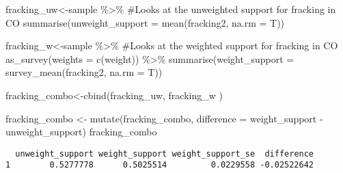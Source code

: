 \documentclass[
  letterpaper,
  DIV=11,
  numbers=noendperiod]{scrreprt}
\newenvironment{Shaded}{\begin{snugshade}}{\end{snugshade}}
\newcommand{\AttributeTok}[1]{\textcolor[rgb]{0.40,0.45,0.13}{#1}}
\newcommand{\CommentTok}[1]{\textcolor[rgb]{0.37,0.37,0.37}{#1}}
\newcommand{\FunctionTok}[1]{\textcolor[rgb]{0.28,0.35,0.67}{#1}}
\newcommand{\NormalTok}[1]{\textcolor[rgb]{0.00,0.23,0.31}{#1}}
\newcommand{\OtherTok}[1]{\textcolor[rgb]{0.00,0.23,0.31}{#1}}
\newcommand{\SpecialCharTok}[1]{\textcolor[rgb]{0.37,0.37,0.37}{#1}}
\begin{document}
\begin{Shaded}
\begin{Highlighting}[]
\NormalTok{fracking\_uw}\OtherTok{\textless{}{-}}\NormalTok{sample }\SpecialCharTok{\%\textgreater{}\%} \CommentTok{\#Looks at the unweighted support for fracking in CO}
  \FunctionTok{summarise}\NormalTok{(}\AttributeTok{unweight\_support =} \FunctionTok{mean}\NormalTok{(fracking2, }\AttributeTok{na.rm =}\NormalTok{ T))}

\NormalTok{fracking\_w}\OtherTok{\textless{}{-}}\NormalTok{sample }\SpecialCharTok{\%\textgreater{}\%} \CommentTok{\#Looks at the weighted support for fracking in CO}
  \FunctionTok{as\_survey}\NormalTok{(}\AttributeTok{weights =} \FunctionTok{c}\NormalTok{(weight)) }\SpecialCharTok{\%\textgreater{}\%}
   \FunctionTok{summarise}\NormalTok{(}\AttributeTok{weight\_support =} \FunctionTok{survey\_mean}\NormalTok{(fracking2, }\AttributeTok{na.rm =}\NormalTok{ T))}


\NormalTok{fracking\_combo}\OtherTok{\textless{}{-}}\FunctionTok{cbind}\NormalTok{(fracking\_uw, fracking\_w ) }

\NormalTok{fracking\_combo }\OtherTok{\textless{}{-}} \FunctionTok{mutate}\NormalTok{(fracking\_combo, }\AttributeTok{difference =}\NormalTok{ weight\_support }\SpecialCharTok{{-}}\NormalTok{ unweight\_support)}
\NormalTok{fracking\_combo}
\end{Highlighting}
\end{Shaded}

\begin{verbatim}
  unweight_support weight_support weight_support_se  difference
1        0.5277778      0.5025514         0.0229558 -0.02522642
\end{verbatim}
\end{document}
